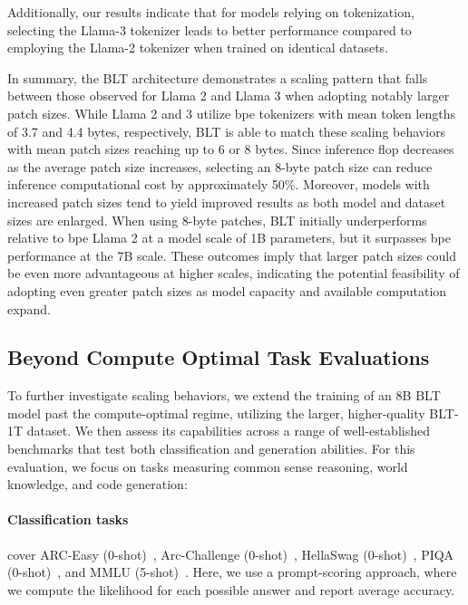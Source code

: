 Additionally, our results indicate that for models relying on tokenization, selecting the Llama-3 tokenizer leads to better performance compared to employing the Llama-2 tokenizer when trained on identical datasets.

In summary, the {\textsc BLT} architecture demonstrates a scaling pattern that falls between those observed for Llama 2 and Llama 3 when adopting notably larger patch sizes. While Llama 2 and 3 utilize bpe tokenizers with mean token lengths of 3.7 and 4.4 bytes, respectively, {\textsc BLT} is able to match these scaling behaviors with mean patch sizes reaching up to 6 or 8 bytes. Since inference flop decreases as the average patch size increases, selecting an 8-byte patch size can reduce inference computational cost by approximately 50\%. Moreover, models with increased patch sizes tend to yield improved results as both model and dataset sizes are enlarged. When using 8-byte patches, {\textsc BLT} initially underperforms relative to bpe Llama 2 at a model scale of 1B parameters, but it surpasses bpe performance at the 7B scale. These outcomes imply that larger patch sizes could be even more advantageous at higher scales, indicating the potential feasibility of adopting even greater patch sizes as model capacity and available computation expand.

\subsection{Beyond Compute Optimal Task Evaluations}
\label{section:evals}
To further investigate scaling behaviors, we extend the training of an 8B {\textsc BLT} model past the compute-optimal regime, utilizing the larger, higher-quality {\textsc BLT}-1T dataset. We then assess its capabilities across a range of well-established benchmarks that test both classification and generation abilities. For this evaluation, we focus on tasks measuring common sense reasoning, world knowledge, and code generation:

\paragraph{Classification tasks} cover ARC-Easy (0-shot)~\citep{Eval_ARC}, Arc-Challenge (0-shot)~\citep{Eval_ARC}, HellaSwag (0-shot)~\citep{Eval_hellaswag}, PIQA (0-shot)~\citep{Eval_piqa}, and MMLU (5-shot)~\citep{hendrycks2020measuring}. Here, we use a prompt-scoring approach, where we compute the likelihood for each possible answer and report average accuracy.

